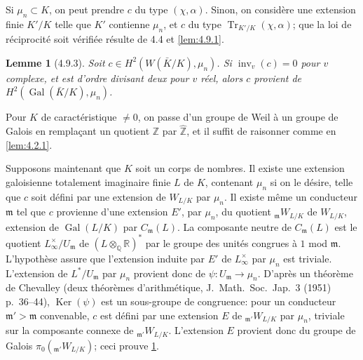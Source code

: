 \documentclass[11pt]{amsart}
\theoremstyle{plain}
\newtheorem{lemme}[theoreme]{Lemme}
\theoremstyle{definition}
\DeclareMathOperator{\Gal}{Gal}
\DeclareMathOperator{\Tr}{Tr}
\DeclareMathOperator{\inv}{inv}
\DeclareMathOperator{\Ker}{Ker}
\newcommand{\R}{\mathbb{R}}
\newcommand{\Z}{\mathbb{Z}}
\newcommand{\Q}{\mathbb{Q}}
\begin{document}
Si $\mu_n\subset K$, on peut prendre $c$ du type $(\chi,\alpha)$. Sinon, on consid\`ere une extension finie $K'/K$ telle que $K'$ contienne $\mu_n$, et $c$ du type $\Tr_{K'/K}(\chi,\alpha)$; que la loi de r\'eciprocit\'e soit v\'erifi\'ee r\'esulte de 4.4 et \ref{lem:4.9.1}.

\begin{lemme}[4.9.3]\label{lem:4.9.3}
Soit $c\in H^2(W(\bar K/K),\mu_n)$. Si $\inv_v(c)=0$ pour $v$ complexe, et est d'ordre divisant deux pour $v$ r\'eel, alors $c$ provient de $H^2(\Gal(\bar K/K),\mu_n)$.
\end{lemme}

Pour $K$ de caract\'eristique $\neq0$, on passe d'un groupe de Weil \`a un groupe de Galois en rempla\c{c}ant un quotient $\Z$ par $\hat{\Z}$, et il suffit de raisonner comme en \ref{lem:4.2.1}.

Supposons maintenant que $K$ soit un corps de nombres. Il existe une extension galoisienne totalement imaginaire finie $L$ de $K$, contenant $\mu_n$ si on le d\'esire, telle que $c$ soit d\'efini par une extension de $W_{L/K}$ par $\mu_n$. Il existe m\^eme un conducteur $\mathfrak{m}$ tel que $c$ provienne d'une extension $E'$, par $\mu_n$, du quotient $_\mathfrak{m}W_{L/K}$ de $W_{L/K}$, extension de $\Gal(L/K)$ par $C_\mathfrak{m}(L)$. La composante neutre de $C_\mathfrak{m}(L)$ est le quotient $L^\times_\infty/U_\mathfrak{m}$ de $(L\otimes_\Q\R)^*$ par le groupe des unit\'es congrues \`a $1$ mod $\mathfrak{m}$. L'hypoth\`ese assure que l'extension induite par $E'$ de $L^\times_\infty$ par $\mu_n$ est triviale. L'extension de $L^*/U_\mathfrak{m}$ par $\mu_n$ provient donc de $\psi\colon U_\mathfrak{m}\to\mu_n$. D'apr\`es un th\'eor\`eme de Chevalley (deux th\'eor\`emes d'arithm\'etique, J.~Math.~Soc.~Jap.~3 (1951) p.~36--44), $\Ker(\psi)$ est un sous-groupe de congruence: pour un conducteur $\mathfrak{m}'>\mathfrak{m}$ convenable, $c$ est d\'efini par une extension $E$ de $_{\mathfrak{m}'}W_{L/K}$ par $\mu_n$, triviale sur la composante connexe de $_{\mathfrak{m}'}W_{L/K}$. L'extension $E$ provient donc du groupe de Galois $\pi_0(_{\mathfrak{m}'}W_{L/K})$; ceci prouve \ref{lem:4.9.3}.
\end{document}
